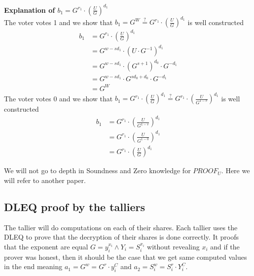 \noindent
\textbf{Explanation of \begin{math}b_1= G^{r_1}  \cdot (\frac{U}{G})^{d_1}\end{math}}\\

\noindent
The voter votes 1 and we show that \begin{math}b_1=   G^W \stackrel{?}{=} G^{r_1}  \cdot (\frac{U}{G})^{d_1} \end{math} is well constructed \begin{align*}
    b_1 &= G^{r_1}  \cdot (\frac{U}{G})^{d_1}                   \\
        &= G^{w-sd_1} \cdot (U \cdot G^{-1})^{d_1}              \\
        &= G^{w-sd_1} \cdot  (G^{s+1})^{d_0} \cdot G^{-d_1}     \\
        &= G^{w-sd_1} \cdot  G^{sd_0+d_0} \cdot G^{-d_1}        \\
        &= G^W
\end{align*}
The voter votes 0 and we show that  \begin{math}b_1= G^{r_1}  \cdot (\frac{U}{G})^{d_1}  \stackrel{?}{=}  G^{r_1}  \cdot (\frac{U}{G^{1-v}})^{d_1} \end{math} is well constructed
\begin{align*}
    b_1 &= G^{r_1}  \cdot (\frac{U}{G^{1-v}})^{d_1}             \\ 
        &= G^{r_1}  \cdot (\frac{U}{G^{1-0}})^{d_1}             \\
        &= G^{r_1}  \cdot (\frac{U}{G})^{d_1}
\end{align*}



\noindent
We will not go to depth in Soundness and Zero knowledge for $PROOF_U$. Here we will refer to another paper. 




\subsection{DLEQ proof by the talliers}
The tallier will do computations on each of their shares. Each tallier uses the DLEQ to prove that the decryption of their shares is done correctly. It proofs that the exponent are equal \begin{math}G = y_i^{x_i}  \land Y_i=S_i^{x_i} \end{math} without revealing \begin{math}x_i \end{math} and if the prover was honest, then it should be the case that we get same computed values in the end meaning \begin{math}a_1=G^w = G^r \cdot y_i^C\end{math} and \begin{math}a_2=S_i^w = S_i^r \cdot Y_i^C\end{math}.\\

